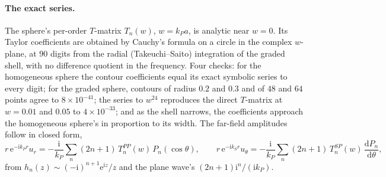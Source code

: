 \documentclass[11pt,a4paper]{article}
\newcommand{\dd}{\mathrm{d}}
\begin{document}
\paragraph{The exact series.} The sphere's per-order $T$-matrix $T_n(w)$, $w=k_Pa$, is analytic near
$w=0$. Its Taylor coefficients are obtained by Cauchy's formula on a circle in the complex $w$-plane, at
$90$ digits from the radial (Takeuchi--Saito) integration of the graded shell, with no difference
quotient in the frequency. Four checks: for the homogeneous sphere the
contour coefficients equal its exact symbolic series to every digit; for the graded sphere, contours of
radius $0.2$ and $0.3$ and of $48$ and $64$ points agree to $8\times10^{-41}$; the series to $w^{24}$
reproduces the direct $T$-matrix at $w=0.01$ and $0.05$ to $4\times10^{-33}$; and as the shell narrows, the
coefficients approach the homogeneous sphere's in proportion to its width. The far-field amplitudes follow
in closed form,
\begin{equation}\label{eq:spherefar}
  r\,\mathrm{e}^{-\mathrm{i}k_Pr}u_r=-\frac{\mathrm{i}}{k_P}\sum_n(2n+1)\,T^{PP}_n(w)\,P_n(\cos\theta),\qquad
  r\,\mathrm{e}^{-\mathrm{i}k_Sr}u_\theta=-\frac{\mathrm{i}}{k_P}\sum_n(2n+1)\,T^{SP}_n(w)\,\frac{\dd P_n}{\dd\theta},
\end{equation}
from $h_n(z)\sim(-\mathrm{i})^{n+1}\mathrm{e}^{\mathrm{i}z}/z$ and the plane wave's $(2n+1)\mathrm{i}^n/(\mathrm{i}k_P)$.
\end{document}
